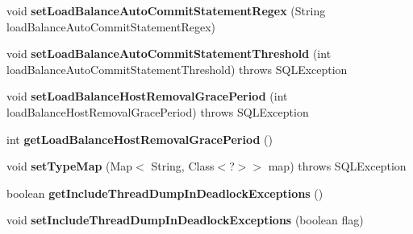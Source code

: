 \begin{DoxyCompactItemize}
void {\bfseries set\+Load\+Balance\+Auto\+Commit\+Statement\+Regex} (String load\+Balance\+Auto\+Commit\+Statement\+Regex)
\item 
\mbox{\label{classcom_1_1mysql_1_1jdbc_1_1jdbc2_1_1optional_1_1_connection_wrapper_ab6d6aee578f79fd262a5fa29eaa055f0}} 
void {\bfseries set\+Load\+Balance\+Auto\+Commit\+Statement\+Threshold} (int load\+Balance\+Auto\+Commit\+Statement\+Threshold)  throws S\+Q\+L\+Exception 
\item 
\mbox{\label{classcom_1_1mysql_1_1jdbc_1_1jdbc2_1_1optional_1_1_connection_wrapper_acf4fc55f06982fe3620d4bd923d4b0ca}} 
void {\bfseries set\+Load\+Balance\+Host\+Removal\+Grace\+Period} (int load\+Balance\+Host\+Removal\+Grace\+Period)  throws S\+Q\+L\+Exception 
\item 
\mbox{\label{classcom_1_1mysql_1_1jdbc_1_1jdbc2_1_1optional_1_1_connection_wrapper_a5ee81a3739bb429bb9ed0a5e44db657f}} 
int {\bfseries get\+Load\+Balance\+Host\+Removal\+Grace\+Period} ()
\item 
\mbox{\label{classcom_1_1mysql_1_1jdbc_1_1jdbc2_1_1optional_1_1_connection_wrapper_ae61206092443b0bf9860131d536ff461}} 
void {\bfseries set\+Type\+Map} (Map$<$ String, Class$<$?$>$$>$ map)  throws S\+Q\+L\+Exception 
\item 
\mbox{\label{classcom_1_1mysql_1_1jdbc_1_1jdbc2_1_1optional_1_1_connection_wrapper_a1723f54915d11b2a5a5c4b38aa807971}} 
boolean {\bfseries get\+Include\+Thread\+Dump\+In\+Deadlock\+Exceptions} ()
\item 
\mbox{\label{classcom_1_1mysql_1_1jdbc_1_1jdbc2_1_1optional_1_1_connection_wrapper_afa68924eec7afde62c2c3e05ce63e6e5}} 
void {\bfseries set\+Include\+Thread\+Dump\+In\+Deadlock\+Exceptions} (boolean flag)
\item 
\mbox{\label{classcom_1_1mysql_1_1jdbc_1_1jdbc2_1_1optional_1_1_connection_wrapper_a0419e61a424b54196daa020759ee13a5}} 
$$
\end{DoxyCompactItemize}
